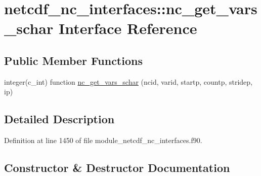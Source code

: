 \hypertarget{interfacenetcdf__nc__interfaces_1_1nc__get__vars__schar}{}\section{netcdf\+\_\+nc\+\_\+interfaces\+:\+:nc\+\_\+get\+\_\+vars\+\_\+schar Interface Reference}
\label{interfacenetcdf__nc__interfaces_1_1nc__get__vars__schar}
\subsection*{Public Member Functions}
\begin{DoxyCompactItemize}
\item 
integer(c\+\_\+int) function \hyperlink{interfacenetcdf__nc__interfaces_1_1nc__get__vars__schar_af362eb0f0a7c7424e871e01ce8bdc35e}{nc\+\_\+get\+\_\+vars\+\_\+schar} (ncid, varid, startp, countp, stridep, ip)
\end{DoxyCompactItemize}


\subsection{Detailed Description}


Definition at line 1450 of file module\+\_\+netcdf\+\_\+nc\+\_\+interfaces.\+f90.



\subsection{Constructor \& Destructor Documentation}
\mbox{\label{interfacenetcdf__nc__interfaces_1_1nc__get__vars__schar_af362eb0f0a7c7424e871e01ce8bdc35e}} 
